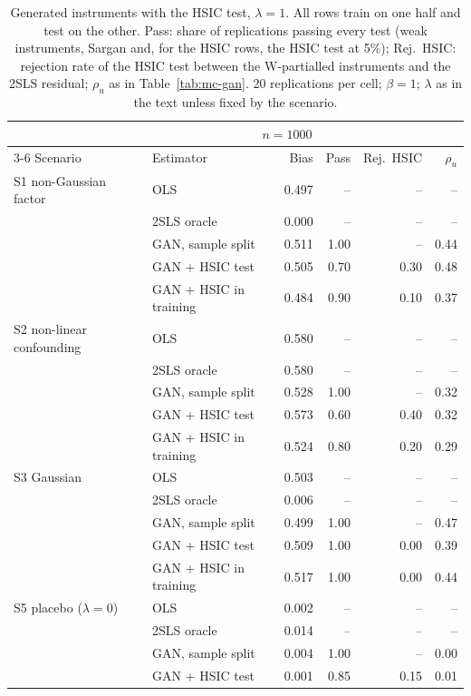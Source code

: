 \begin{table}[ht]
\centering
\scriptsize
\setlength{\tabcolsep}{2.5pt}
\caption{Generated instruments with the HSIC test, $\lambda=1$. All rows train on one half and test on the other. Pass: share of replications passing every test (weak instruments, Sargan and, for the HSIC rows, the HSIC test at 5\%); Rej.\ HSIC: rejection rate of the HSIC test between the W-partialled instruments and the 2SLS residual; $\rho_u$ as in Table~\ref{tab:mc-gan}.  20 replications per cell; $\beta=1$; $\lambda$ as in the text unless fixed by the scenario.}\label{tab:mc-gan-hsic}
\begin{tabular}{@{}llrrrr@{}}
\toprule
 & \multicolumn{4}{c}{$n=1000$} \\
\cmidrule(lr){3-6}
Scenario & Estimator & Bias & Pass & Rej.\ HSIC & $\rho_u$ \\
\midrule
S1 non-Gaussian factor & OLS & 0.497 & -- & -- & -- \\
 & 2SLS oracle & 0.000 & -- & -- & -- \\
 & GAN, sample split & 0.511 & 1.00 & -- & 0.44 \\
 & GAN + HSIC test & 0.505 & 0.70 & 0.30 & 0.48 \\
 & GAN + HSIC in training & 0.484 & 0.90 & 0.10 & 0.37 \\
\addlinespace
S2 non-linear confounding & OLS & 0.580 & -- & -- & -- \\
 & 2SLS oracle & 0.580 & -- & -- & -- \\
 & GAN, sample split & 0.528 & 1.00 & -- & 0.32 \\
 & GAN + HSIC test & 0.573 & 0.60 & 0.40 & 0.32 \\
 & GAN + HSIC in training & 0.524 & 0.80 & 0.20 & 0.29 \\
\addlinespace
S3 Gaussian & OLS & 0.503 & -- & -- & -- \\
 & 2SLS oracle & 0.006 & -- & -- & -- \\
 & GAN, sample split & 0.499 & 1.00 & -- & 0.47 \\
 & GAN + HSIC test & 0.509 & 1.00 & 0.00 & 0.39 \\
 & GAN + HSIC in training & 0.517 & 1.00 & 0.00 & 0.44 \\
\addlinespace
S5 placebo ($\lambda=0$) & OLS & 0.002 & -- & -- & -- \\
 & 2SLS oracle & 0.014 & -- & -- & -- \\
 & GAN, sample split & 0.004 & 1.00 & -- & 0.00 \\
 & GAN + HSIC test & 0.001 & 0.85 & 0.15 & 0.01 \\

\end{tabular}
\end{table}
